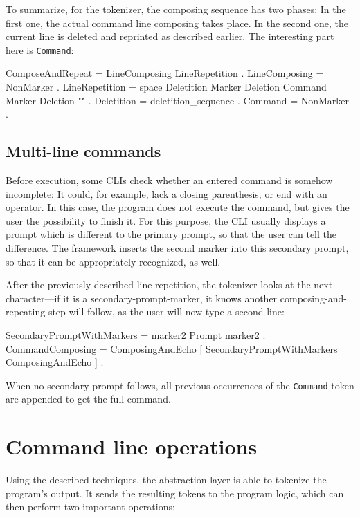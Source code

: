 \documentclass[paper=a4,twoside,abstract=on,cleardoublepage=empty,numbers=noenddot,toc=bib,12pt,appendixprefix=true]{scrreprt}
\begin{document}
To summarize, for the tokenizer, the composing sequence has two phases: In the first one, the actual command line composing takes place. In the second one, the current line is deleted and reprinted as described earlier. The interesting part here is \texttt{Command}:

\begin{ebnf}
ComposeAndRepeat = LineComposing LineRepetition .
LineComposing = { NonMarker } .
LineRepetition = space Deletition Marker Deletion Command
    Marker Deletion "\r" .
Deletition = { deletition_sequence } .
Command = { NonMarker } .
\end{ebnf}

\subsection*{Multi-line commands}

Before execution, some \textsc{CLI}s check whether an entered command is somehow incomplete: It could, for example, lack a closing parenthesis, or end with an operator. In this case, the program does not execute the command, but gives the user the possibility to finish it. For this purpose, the \textsc{CLI} usually displays a prompt which is different to the primary prompt, so that the user can tell the difference. The framework inserts the second marker into this secondary prompt, so that it can be appropriately recognized, as well.

After the previously described line repetition, the tokenizer looks at the next character---if it is a secondary-prompt-marker, it knows another composing-and-repeating step will follow, as the user will now type a second line:

\begin{ebnf}
SecondaryPromptWithMarkers = marker2 Prompt marker2 .
CommandComposing = ComposingAndEcho
    [ { SecondaryPromptWithMarkers ComposingAndEcho } ] .
\end{ebnf}
%
When no secondary prompt follows, all previous occurrences of the \texttt{Command} token are appended to get the full command.

\section{Command line operations}
\label{sec:cliops}

Using the described techniques, the abstraction layer is able to tokenize the program's output. It sends the resulting tokens to the program logic, which can then perform two important operations:
\end{document}
